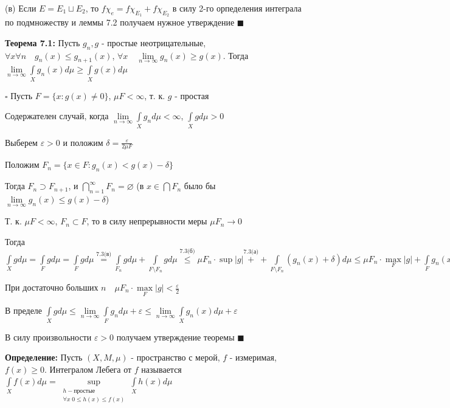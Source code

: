 \documentclass[a4paper]{report}
\begin{document}
(в) Если $E=E_1\sqcup E_2$, то $f\chi_e=f\chi_{E_1}+f\chi_{E_2}$ в силу 2-го орпеделения интеграла по подмножеству и леммы 7.2 получаем нужное утверждение
$\blacksquare$
\bigskip

\noindent\textbf{Теорема 7.1:} Пусть $g_n,g$ - простые неотрицательные, $\forall x\forall n\quad g_n(x)\le g_{n+1}(x)$, $\forall x\quad\lim\limits_{n\to\infty} g_n(x)\ge g(x)$. Тогда $\lim\limits_{n\to\infty}\displaystyle\int\limits_X g_n(x)d\mu\ge\displaystyle\int\limits_X g(x)d\mu$

\noindent $\square$ Пусть $F=\{x\colon g(x)\ne0\}$, $\mu F<\infty$, т. к. $g$ - простая

Содержателен случай, когда $\lim\limits_{n\to\infty}\displaystyle\int\limits_X g_nd\mu<\infty$, $\displaystyle\int\limits_X gd\mu>0$

Выберем $\varepsilon>0$ и положим $\delta=\displaystyle\frac{\varepsilon}{2\mu F}$

Положим $F_n=\{x\in F\colon g_n(x)<g(x)-\delta\}$

Тогда $F_n\supset F_{n+1}$, и $\bigcap\limits_{n=1}^\infty F_n=\varnothing$ (в $x\in\bigcap F_n$ было бы $\lim\limits_{n\to\infty}g_n(x)\le g(x)-\delta$)

Т. к. $\mu F<\infty$, $F_n\subset F$, то в силу непрерывности меры $\mu F_n\to0$

Тогда $\displaystyle\int\limits_X gd\mu=\displaystyle\int\limits_F gd\mu=\displaystyle\int\limits_F gd\mu\stackrel{7.3\text{(в)}}{=}\displaystyle\int\limits_{F_n} gd\mu+\displaystyle\int\limits_{F\setminus F_n} gd\mu
\stackrel{7.3\text{(б)}}{\le}\mu F_n\cdot \sup|g|\stackrel{7.3\text{(а)}}{+}+\displaystyle\int\limits_{F\setminus F_n}(g_n(x)+\delta)d\mu\le\mu F_n\cdot\max\limits_F|g|+\displaystyle\int\limits_F g_n(x)d\mu+\delta\cdot\mu F$

При достаточно больших $n\quad\mu F_n\cdot\max\limits_F|g|<\frac\varepsilon2$

В пределе $\displaystyle\int\limits_X gd\mu\le\lim\limits_{n\to\infty}\displaystyle\int\limits_F g_n d\mu+\varepsilon\le\lim\limits_{n\to\infty}\displaystyle\int\limits_X g_n(x)d\mu+\varepsilon$

В силу произвольности $\varepsilon>0$ получаем утверждение теоремы $\blacksquare$
\bigskip

\noindent\textbf{Определение:} Пусть $(X,M,\mu)$ - пространство с мерой, $f$ - измеримая, $f(x)\ge0$. Интегралом Лебега от $f$ называется $\displaystyle\int\limits_X f(x)d\mu=\sup\limits_{\substack{h - \text{простые}\\ \forall x\; 0\le h(x)\le f(x)}}\displaystyle\int\limits_X h(x)d\mu$
\end{document}
